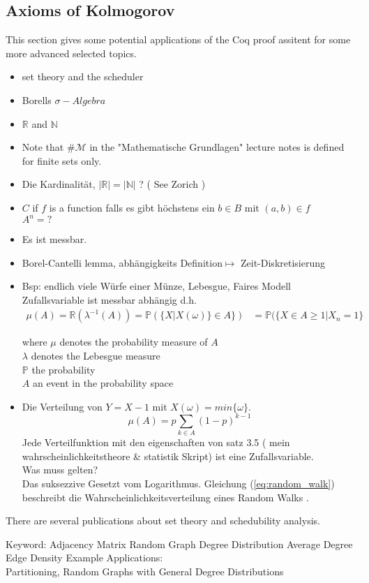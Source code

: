 	
	
	\clearpage
	
	
\subsection{Axioms of Kolmogorov}
\label{subsec:AxiomsOfKolmogorov }
 
 This section gives some potential applications of the Coq proof assitent for some more advanced selected topics.
 	
 

 \begin{itemize}
	\item set theory and the scheduler	      
 	\item Borells $\sigma-Algebra$
 	\item $\mathbb{R}$ and $\mathbb{N}$
 	\item Note that $\# \mathcal{M}$ in the "Mathematische Grundlagen" lecture notes \cite[]{} is defined for finite sets only.  
	 \item Die Kardinalität, $|\mathbb{R}| = |\mathbb{N}|$ ? ( See Zorich )
 	 \item $C$ if $f$ is a function  falls es gibt höchstens ein $b\in B$ mit $(a,b)\in f$\\
 		 $A^n = ?$
 	\item Es ist messbar.
 \item   Borel-Cantelli lemma, abhängigkeits Definition$\mapsto$ Zeit-Diskretisierung
 \item Bsp: endlich viele Würfe einer Münze, Lebesgue, Faires Modell\\
 		Zufallsvariable ist messbar abhängig d.h. 
 		\begin{align}
 			\mu(A) = \mathbb{R}(\lambda^{-1}(A)) = \mathbb{P} (\{ X| X(\omega)\} \in A \})
 				 & = \mathbb{P}(\{ X \in A \geq 1| X_n = 1 \} 
 		\end{align}  
 		
 		where $\mu$ denotes the probability measure of $A$\\
 		$\lambda$ denotes the Lebesgue measure\\
 		$\mathbb{P}$ the probability\\
 		$A$ an event in the probability space\\
 	
 					
 \item Die Verteilung von $Y = X-1$ mit $X(\omega) = min \{ \omega \}$.
       \begin{equation}\label{eq:random_walk}
       	\mu(A)= p \sum_{k \in A } (1-p) ^{k-1}    	
       	\end{equation}
 		Jede Verteilfunktion mit den eigenschaften von satz 3.5 ( mein wahrscheinlichkeitstheore \& statistik Skript) ist eine Zufallsvariable.\\
 		Was muss gelten?\\
 		Das suksezzive Gesetzt vom Logarithmus.   
   		Gleichung (\ref{eq:random_walk}) beschreibt die Wahrscheinlichkeitsverteilung eines Random Walks . 
 \end{itemize}
 
 
   There are several publications about set theory and schedubility analysis.\par   
   Keyword: Adjacency Matrix Random Graph Degree Distribution Average Degree Edge Density
   Example Applications:\\
   Partitioning, Random Graphs with General Degree Distributions
 		
